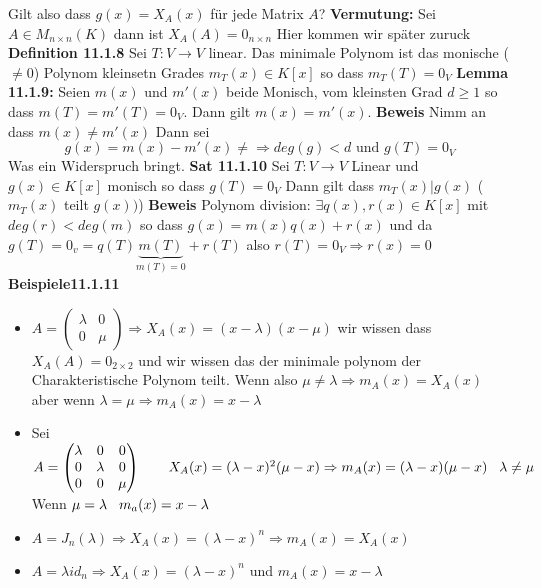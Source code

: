 \documentclass{article}
\newcommand{\mspc}{\hspace{0.7cm}}
\newcommand{\smspc}{\hspace{0.3cm}}
\begin{document}
Gilt also dass $g(x)=X_A(x)$ für jede Matrix $A$?
\newline
\textbf{Vermutung:} Sei $A\in M_{n\times n}(K)$ dann ist $X_A(A)=0_{n \times n}$ Hier kommen wir später zuruck
\newline\textbf{Definition 11.1.8} Sei $T:V\rightarrow V$ linear. Das minimale Polynom ist das monische ($\neq 0$) Polynom kleinsetn Grades $m_T(x)\in K[x]$ so dass $m_T(T)=0_V$
\newline \textbf{Lemma 11.1.9:} Seien $m(x)$ und $m'(x)$ beide Monisch, vom kleinsten Grad $d\ge1$ so dass $m(T)=m'(T)=0_V$. Dann gilt $m(x)=m'(x)$.\newline
\textbf{Beweis} Nimm an dass $m(x)\neq m'(x)$ Dann sei \[g(x)=m(x)-m'(x)\neq\Rightarrow deg(g)<d\text{ und } g(T)=0_V\]Was ein Widerspruch bringt.\newline
\textbf{Sat 11.1.10} Sei $T:V\rightarrow V$ Linear und $g(x)\in K[x]$ monisch so dass $g(T)=0_V$ Dann gilt dass $m_T(x)|g(x)$ ($m_T(x)$ teilt $g(x))$)
\newline\textbf{Beweis} Polynom division: $\exists q(x), r(x)\in K[x]$ mit $deg(r)<deg(m)$ so dass $g(x)=m(x)q(x)+r(x)$ und da $g(T)=0_v=q(T)\underset{m(T)=0}{\underbrace{m(T)}}+r(T)$ also $r(T)=0_V\Rightarrow r(x)=0$ 
\newline\textbf{Beispiele{11.1.11}}
\begin{itemize}
  \item{$A=\begin{pmatrix}\lambda&0\\0&\mu\end{pmatrix}\Rightarrow X_A(x)=(x-\lambda)(x-\mu)$ wir wissen dass $X_A(A)=0_{2\times 2}$ und wir wissen das der minimale polynom der Charakteristische Polynom teilt. Wenn also $\mu\neq\lambda\Rightarrow m_A(x)=X_A(x)$ aber wenn $\lambda=\mu\Rightarrow m_A(x)=x-\lambda$}
  \item{Sei $A=\begin{pmatrix}\lambda&0&0\\0&\lambda&0\\0&0&\mu\end{pmatrix}\mspc X_A(x)=(\lambda-x)^2(\mu-x)\Rightarrow m_A(x)=(\lambda-x)(\mu-x) \smspc\lambda\neq\mu$ Wenn $\mu=\lambda\smspc m_a(x)=x-\lambda$}
  \item{$A=J_n(\lambda)\Rightarrow X_A(x)=(\lambda-x)^n\Rightarrow m_A(x)=X_A(x)$ }
  \item{$A=\lambda id_n\Rightarrow X_A(x)=(\lambda-x)^n$ und $m_A(x)=x-\lambda$}
\end{itemize}
\end{document}
